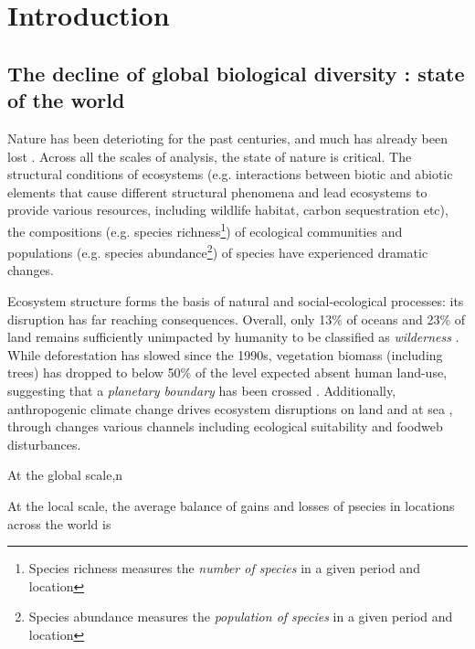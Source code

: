 \chapter*{Introduction}
\label{Introduction}

\section*{The decline of global biological diversity : state of the world}

\label{intro:facts}
Nature has been deterioting for the past centuries, and much has already been lost \citep{ipbes_2022_6417333}. Across all the scales of analysis, the state of nature is critical. The structural conditions of ecosystems (e.g. interactions between biotic and abiotic elements that cause different structural phenomena and lead ecosystems to provide various resources, including wildlife habitat, carbon sequestration etc), the compositions (e.g. species richness\footnote{ Species richness measures the \textit{number of species} in a given period and location}) of ecological communities and populations (e.g. species abundance\footnote{ Species abundance measures the \textit{population of species} in a given period and location}) of species have experienced dramatic changes. 

Ecosystem structure forms the basis of natural and social-ecological processes: its disruption has far reaching consequences. Overall, only 13\% of oceans and 23\% of land remains sufficiently unimpacted by humanity to be classified as \textit{wilderness} \citep{jones_2018_location, watson_2016_catastrophic}. While deforestation has slowed since the 1990s, vegetation biomass (including trees) has dropped to below 50\% of the level expected absent human land-use, suggesting that a \textit{planetary boundary} has been crossed \citep{steffen_2015_planetary}. Additionally, anthropogenic climate change drives ecosystem disruptions on land \citep{conradi_reassessment_2024} and at sea \citep{gomes_marine_2024}, through changes various channels including ecological suitability and foodweb disturbances.





 At the global scale,n 

At the local scale, the average balance of gains and losses of psecies in locations across the world is 


